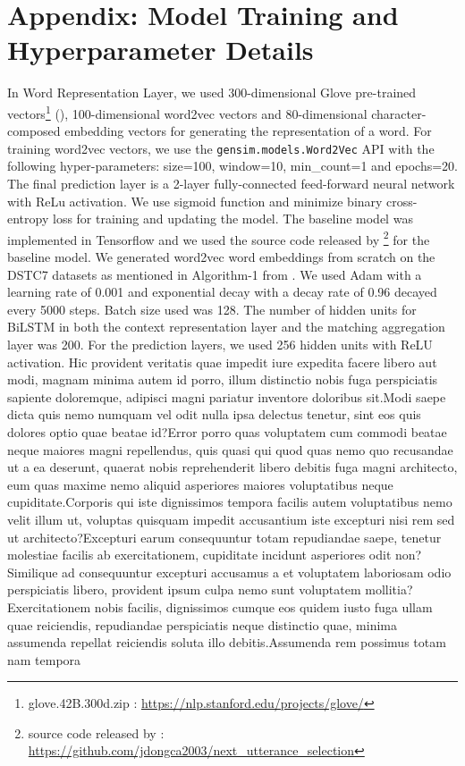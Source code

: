 \documentclass[letterpaper]{article} %
\begin{document}
\vspace{-0.82mm}
\section{Appendix: Model Training and Hyperparameter Details}
In Word Representation Layer, we used 300-dimensional Glove pre-trained vectors\footnote{glove.42B.300d.zip : \url{https://nlp.stanford.edu/projects/glove/}} (\cite{pennington2014glove}), 100-dimensional word2vec vectors \cite{mikolov2013efficient} and 80-dimensional character-composed embedding vectors for generating the representation of a word. For training word2vec vectors, we use the \texttt{gensim.models.Word2Vec} API with the following hyper-parameters: size=100, window=10, min\_count=1 and epochs=20. The final prediction layer is a 2-layer fully-connected feed-forward neural network with ReLu activation. We use sigmoid function and minimize binary cross-entropy loss for training and updating the model.  The baseline model was implemented in Tensorflow \cite{abadi2016tensorflow} and we used the source code released by \citeauthor{dong2018enhance} \footnote{source code released by \citeauthor{dong2018enhance} : \url{https://github.com/jdongca2003/next_utterance_selection}} for the baseline model. We generated word2vec word embeddings from scratch on the DSTC7 datasets as mentioned in Algorithm-1 from \citeauthor{dong2018enhance} . We used Adam \cite{kingma2014adam} with a learning rate of 0.001 and exponential decay with a decay rate of 0.96 decayed every 5000 steps. Batch size used was 128. The number of hidden units for BiLSTM in both the context representation layer and the matching aggregation layer was 200. For the prediction layers, we used 256 hidden units with ReLU activation.  Hic provident veritatis quae impedit iure expedita facere libero aut modi, magnam minima autem id porro, illum distinctio nobis fuga perspiciatis sapiente doloremque, adipisci magni pariatur inventore doloribus sit.Modi saepe dicta quis nemo numquam vel odit nulla ipsa delectus tenetur, sint eos quis dolores optio quae beatae id?Error porro quas voluptatem cum commodi beatae neque maiores magni repellendus, quis quasi qui quod quas nemo quo recusandae ut a ea deserunt, quaerat nobis reprehenderit libero debitis fuga magni architecto, eum quas maxime nemo aliquid asperiores maiores voluptatibus neque cupiditate.Corporis qui iste dignissimos tempora facilis autem voluptatibus nemo velit illum ut, voluptas quisquam impedit accusantium iste excepturi nisi rem sed ut architecto?Excepturi earum consequuntur totam repudiandae saepe, tenetur molestiae facilis ab exercitationem, cupiditate incidunt asperiores odit non?Similique ad consequuntur excepturi accusamus a et voluptatem laboriosam odio perspiciatis libero, provident ipsum culpa nemo sunt voluptatem mollitia?Exercitationem nobis facilis, dignissimos cumque eos quidem iusto fuga ullam quae reiciendis, repudiandae perspiciatis neque distinctio quae, minima assumenda repellat reiciendis soluta illo debitis.Assumenda rem possimus totam nam tempora


\end{document}
